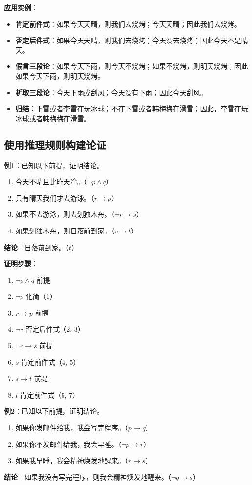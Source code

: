 \documentclass[UTF8,11pt,a4paper]{ctexbook}   %
\theoremstyle{definition}
\begin{document}
\textbf{应用实例}：
\begin{itemize}
    \item \textbf{肯定前件式}：如果今天天晴，则我们去烧烤；今天天晴；因此我们去烧烤。
    \item \textbf{否定后件式}：如果今天天晴，则我们去烧烤；今天没去烧烤；因此今天不是晴天。
    \item \textbf{假言三段论}：如果今天下雨，则今天不烧烤；如果不烧烤，则明天烧烤；因此如果今天下雨，则明天烧烤。
    \item \textbf{析取三段论}：今天下雨或刮风；今天没有下雨；因此今天刮风。
    \item \textbf{归结}：下雪或者李雷在玩冰球；不在下雪或者韩梅梅在滑雪；因此，李雷在玩冰球或者韩梅梅在滑雪。
\end{itemize}

\subsection{使用推理规则构建论证}

\textbf{例1}：已知以下前提，证明结论。
\begin{enumerate}
    \item 今天不晴且比昨天冷。（$\neg p\land q$）
    \item 只有晴天我们才去游泳。（$r\to p$）
    \item 如果不去游泳，则去划独木舟。（$\neg r\to s$）
    \item 如果划独木舟，则日落前到家。（$s\to t$）
\end{enumerate}
\textbf{结论}：日落前到家。（$t$）

\textbf{证明步骤}：
\begin{enumerate}
    \item $\neg p\land q$ \hfill 前提
    \item $\neg p$ \hfill 化简（1）
    \item $r\to p$ \hfill 前提
    \item $\neg r$ \hfill 否定后件式（2, 3）
    \item $\neg r\to s$ \hfill 前提
    \item $s$ \hfill 肯定前件式（4, 5）
    \item $s\to t$ \hfill 前提
    \item $t$ \hfill 肯定前件式（6, 7）
\end{enumerate}

\textbf{例2}：已知以下前提，证明结论。
\begin{enumerate}
    \item 如果你发邮件给我，我会写完程序。（$p\to q$）
    \item 如果你不发邮件给我，我会早睡。（$\neg p\to r$）
    \item 如果我早睡，我会精神焕发地醒来。（$r\to s$）
\end{enumerate}
\textbf{结论}：如果我没有写完程序，则我会精神焕发地醒来。（$\neg q\to s$）
\end{document}
